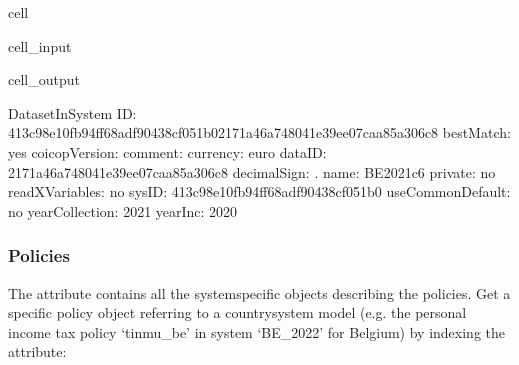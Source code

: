 \documentclass[letterpaper,10pt,english]{sphinxmanual}
\begin{document}
\begin{sphinxuseclass}{cell}
\begin{sphinxuseclass}{cell_input}
\begin{sphinxVerbatim}[commandchars=\\\{\}]
\PYG{p}{[}\PYG{p}{]}\PYG{p}{[}\PYG{p}{]}\PYG{p}{[}\PYG{p}{]}
\end{sphinxVerbatim}

\end{sphinxuseclass}
\begin{sphinxuseclass}{cell_output}
\begin{sphinxVerbatim}[commandchars=\\\{\}]
\PYGZhy{}\PYGZhy{}\PYGZhy{}\PYGZhy{}\PYGZhy{}\PYGZhy{}\PYGZhy{}\PYGZhy{}\PYGZhy{}\PYGZhy{}\PYGZhy{}\PYGZhy{}\PYGZhy{}\PYGZhy{}\PYGZhy{}\PYGZhy{}\PYGZhy{}\PYGZhy{}\PYGZhy{}\PYGZhy{}\PYGZhy{}\PYGZhy{}\PYGZhy{}\PYGZhy{}\PYGZhy{}\PYGZhy{}\PYGZhy{}\PYGZhy{}\PYGZhy{}\PYGZhy{}
DatasetInSystem
\PYGZhy{}\PYGZhy{}\PYGZhy{}\PYGZhy{}\PYGZhy{}\PYGZhy{}\PYGZhy{}\PYGZhy{}\PYGZhy{}\PYGZhy{}\PYGZhy{}\PYGZhy{}\PYGZhy{}\PYGZhy{}\PYGZhy{}\PYGZhy{}\PYGZhy{}\PYGZhy{}\PYGZhy{}\PYGZhy{}\PYGZhy{}\PYGZhy{}\PYGZhy{}\PYGZhy{}\PYGZhy{}\PYGZhy{}\PYGZhy{}\PYGZhy{}\PYGZhy{}\PYGZhy{}
	 ID: \PYGZsq{}413c98e1\PYGZhy{}0fb9\PYGZhy{}4ff6\PYGZhy{}8adf\PYGZhy{}90438cf051b02171a46a\PYGZhy{}7480\PYGZhy{}41e3\PYGZhy{}9ee0\PYGZhy{}7caa85a306c8\PYGZsq{}
	 bestMatch: \PYGZsq{}yes\PYGZsq{}
	 coicopVersion: \PYGZsq{}\PYGZsq{}
	 comment: \PYGZsq{}\PYGZsq{}
	 currency: \PYGZsq{}euro\PYGZsq{}
	 dataID: \PYGZsq{}2171a46a\PYGZhy{}7480\PYGZhy{}41e3\PYGZhy{}9ee0\PYGZhy{}7caa85a306c8\PYGZsq{}
	 decimalSign: \PYGZsq{}.\PYGZsq{}
	 name: \PYGZsq{}BE\PYGZus{}2021\PYGZus{}c6\PYGZsq{}
	 private: \PYGZsq{}no\PYGZsq{}
	 readXVariables: \PYGZsq{}no\PYGZsq{}
	 sysID: \PYGZsq{}413c98e1\PYGZhy{}0fb9\PYGZhy{}4ff6\PYGZhy{}8adf\PYGZhy{}90438cf051b0\PYGZsq{}
	 useCommonDefault: \PYGZsq{}no\PYGZsq{}
	 yearCollection: \PYGZsq{}2021\PYGZsq{}
	 yearInc: \PYGZsq{}2020\PYGZsq{}
\end{sphinxVerbatim}

\end{sphinxuseclass}
\end{sphinxuseclass}

\subsubsection{Policies}
\label{\detokenize{notebooks/userguide:id3}}
\sphinxAtStartPar
The attribute  contains all the system\sphinxhyphen{}specific  objects describing the policies.
Get a specific policy object referring to a country\sphinxhyphen{}system model (e.g. the personal income tax policy ‘tinmu\_be’ in system ‘BE\_2022’ for Belgium) by indexing the  attribute:
\end{document}
